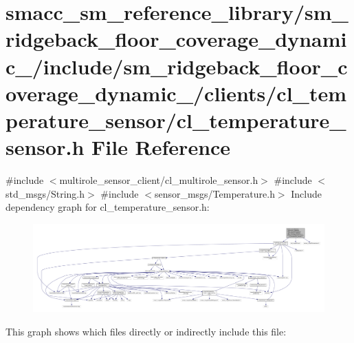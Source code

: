 \hypertarget{sm__ridgeback__floor__coverage__dynamic__1_2include_2sm__ridgeback__floor__coverage__dynamic__1_5c2e47356143d5d6f273faf6c0548a7d}{}\section{smacc\+\_\+sm\+\_\+reference\+\_\+library/sm\+\_\+ridgeback\+\_\+floor\+\_\+coverage\+\_\+dynamic\+\_/include/sm\+\_\+ridgeback\+\_\+floor\+\_\+coverage\+\_\+dynamic\+\_/clients/cl\+\_\+temperature\+\_\+sensor/cl\+\_\+temperature\+\_\+sensor.h File Reference}
\label{sm__ridgeback__floor__coverage__dynamic__1_2include_2sm__ridgeback__floor__coverage__dynamic__1_5c2e47356143d5d6f273faf6c0548a7d}
{\ttfamily \#include $<$multirole\+\_\+sensor\+\_\+client/cl\+\_\+multirole\+\_\+sensor.\+h$>$}\newline
{\ttfamily \#include $<$std\+\_\+msgs/\+String.\+h$>$}\newline
{\ttfamily \#include $<$sensor\+\_\+msgs/\+Temperature.\+h$>$}\newline
Include dependency graph for cl\+\_\+temperature\+\_\+sensor.\+h\+:
\nopagebreak
\begin{figure}[H]
\begin{center}
\leavevmode
\includegraphics[width=350pt]{sm__ridgeback__floor__coverage__dynamic__1_2include_2sm__ridgeback__floor__coverage__dynamic__1_df3da5ab1064bfac1a3d70ebe441fdcc}
\end{center}
\end{figure}
This graph shows which files directly or indirectly include this file\+:
\nopagebreak
